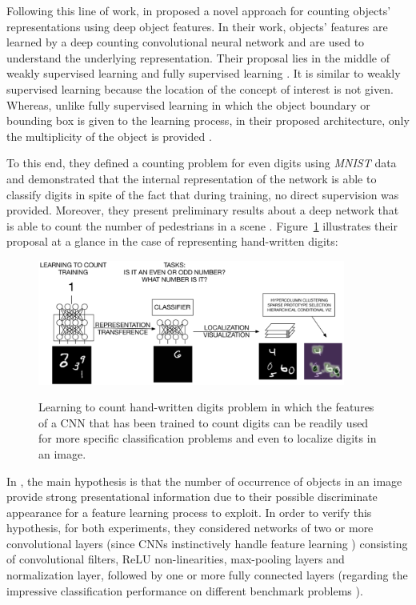 Following this line of work,   in \cite{segui2015learning} proposed a novel approach for counting objects' representations using deep object features. In their work, objects' features are learned by a deep counting convolutional neural network and are used to understand the underlying representation. Their proposal lies in the middle of weakly supervised learning and fully supervised learning \cite{mohri2012foundations}. It is similar to weakly supervised learning because the location of the concept of interest is not given. Whereas, unlike fully supervised learning in which the object boundary or bounding box is given to the learning process, in their proposed architecture, only the multiplicity of the object is provided \cite{segui2015learning}.

To this end, they defined a counting problem for even digits using \textit{MNIST} data and demonstrated that the internal representation of the network is able to classify digits in spite of the fact that during training, no direct supervision was provided. Moreover, they present preliminary results about a deep network that is able to count the number of pedestrians in a scene \cite{segui2015learning}. Figure~\ref{fig:santimnist} illustrates their proposal at a glance in the case of representing hand-written digits:
\begin{figure}[H]
	\centering
	{\includegraphics[width=0.9\textwidth]{images/santimnist}}
	\caption{Learning to count hand-written digits problem in which the features of a CNN that has been trained to count digits can be readily used for more specific classification problems and even to localize digits in an image\cite{segui2015learning}.}
	\label{fig:santimnist}
\end{figure}

In \cite{segui2015learning}, the main hypothesis is that the number of occurrence of objects in an image provide strong presentational information due to their possible discriminate appearance for a feature learning process to exploit. In order to verify this hypothesis, for both experiments, they considered networks of two or more convolutional layers (since CNNs instinctively handle feature learning \cite{lecun1989backpropagation}) consisting of convolutional filters, ReLU non-linearities, max-pooling layers and normalization layer, followed by one or more fully connected layers (regarding the impressive classification performance on different benchmark problems \cite{krizhevsky2012imagenet, Karpathy_2014_CVPR, ciresan2011flexible})\cite{segui2015learning}. 

